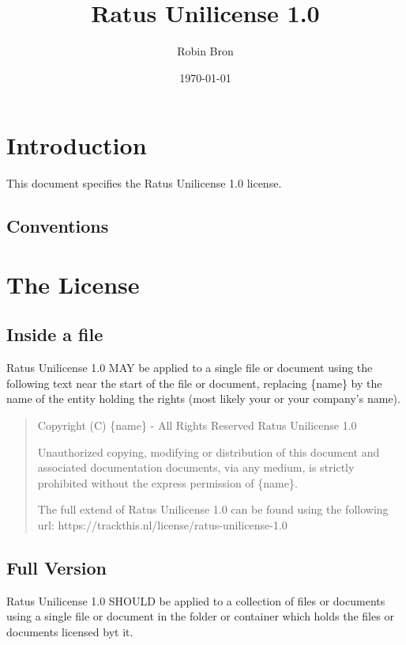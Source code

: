 \documentclass[a4paper,12pt]{article}
\begin{document}
\title{Ratus Unilicense 1.0}
\author{Robin Bron}
\date{\today}
\maketitle

\vfill

\newpage
\tableofcontents
\newpage


\section{Introduction}
  This document specifies the Ratus Unilicense 1.0 license.

\subsection{Conventions}


\newpage
\section{The License}

\subsection{Inside a file}
  Ratus Unilicense 1.0 MAY be applied to a single file or document using the
  following text near the start of the file or document, replacing \{name\} by
  the name of the entity holding the rights (most likely your or your company's
  name).

  \begin{quote}
    Copyright (C) \{name\} - All Rights Reserved
    Ratus Unilicense 1.0

    Unauthorized copying, modifying or distribution of this document and
    associated documentation documents, via any medium, is strictly prohibited
    without the express permission of \{name\}.

    The full extend of Ratus Unilicense 1.0 can be found using the following
    url: https://trackthis.nl/license/ratus-unilicense-1.0
  \end{quote}

\subsection{Full Version}
  Ratus Unilicense 1.0 SHOULD be applied to a collection of files or documents
  using a single  file or document in the folder or container
  which holds the files or documents licensed byt it.
\end{document}
